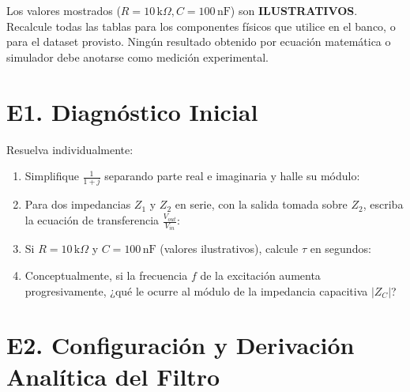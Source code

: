 \documentclass[11pt, a4paper]{article}
\begin{document}
\begin{tcolorbox}[colback=red!5, colframe=red!80!black, title=\textbf{ATENCIÓN: Validez de los Datos}]
    Los valores mostrados ($R=10\,\text{k}\Omega, C=100\,\text{nF}$) son \textbf{ILUSTRATIVOS}. Recalcule todas las tablas para los componentes físicos que utilice en el banco, o para el dataset provisto. Ningún resultado obtenido por ecuación matemática o simulador debe anotarse como medición experimental.
\end{tcolorbox}

\section*{E1. Diagnóstico Inicial}
Resuelva individualmente:
\begin{enumerate}
    \item Simplifique $\frac{1}{1+j}$ separando parte real e imaginaria y halle su módulo: \vspace{1.2cm}
    \item Para dos impedancias $Z_1$ y $Z_2$ en serie, con la salida tomada sobre $Z_2$, escriba la ecuación de transferencia $\frac{V_{out}}{V_{in}}$: \vspace{1.2cm}
    \item Si $R=10\,\text{k}\Omega$ y $C=100\,\text{nF}$ (valores ilustrativos), calcule $\tau$ en segundos: \vspace{1.2cm}
    \item Conceptualmente, si la frecuencia $f$ de la excitación aumenta progresivamente, ¿qué le ocurre al módulo de la impedancia capacitiva $|Z_C|$? \vspace{1.2cm}
\end{enumerate}

\section*{E2. Configuración y Derivación Analítica del Filtro}
\end{document}
